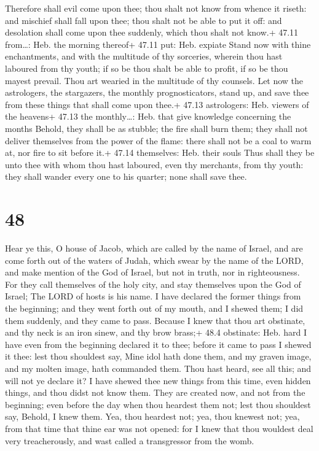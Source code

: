  Therefore shall evil come upon thee; thou shalt not know
from whence it riseth: and mischief shall fall upon thee; thou shalt not
be able to put it off: and desolation shall come upon thee suddenly,
which thou shalt not know.+ 47.11 from\ldots: Heb. the morning thereof+
47.11 put: Heb. expiate  Stand now with thine enchantments,
and with the multitude of thy sorceries, wherein thou hast laboured from
thy youth; if so be thou shalt be able to profit, if so be thou mayest
prevail.  Thou art wearied in the multitude of thy
counsels. Let now the astrologers, the stargazers, the monthly
prognosticators, stand up, and save thee from these things that shall
come upon thee.+ 47.13 astrologers: Heb. viewers of the heavens+ 47.13
the monthly\ldots: Heb. that give knowledge concerning the months
 Behold, they shall be as stubble; the fire shall burn
them; they shall not deliver themselves from the power of the flame:
there shall not be a coal to warm at, nor fire to sit before it.+ 47.14
themselves: Heb. their souls  Thus shall they be unto thee
with whom thou hast laboured, even thy merchants, from thy youth: they
shall wander every one to his quarter; none shall save thee.

\hypertarget{section-47}{%
\section{48}\label{section-47}}

 Hear ye this, O house of Jacob, which are called by the
name of Israel, and are come forth out of the waters of Judah, which
swear by the name of the LORD, and make mention of the God of Israel,
but not in truth, nor in righteousness.  For they call
themselves of the holy city, and stay themselves upon the God of Israel;
The LORD of hosts is his name.  I have declared the former
things from the beginning; and they went forth out of my mouth, and I
shewed them; I did them suddenly, and they came to pass. 
Because I knew that thou art obstinate, and thy neck is an iron sinew,
and thy brow brass;+ 48.4 obstinate: Heb. hard  I have even
from the beginning declared it to thee; before it came to pass I shewed
it thee: lest thou shouldest say, Mine idol hath done them, and my
graven image, and my molten image, hath commanded them. 
Thou hast heard, see all this; and will not ye declare it? I have shewed
thee new things from this time, even hidden things, and thou didst not
know them.  They are created now, and not from the
beginning; even before the day when thou heardest them not; lest thou
shouldest say, Behold, I knew them.  Yea, thou heardest not;
yea, thou knewest not; yea, from that time that thine ear was not
opened: for I knew that thou wouldest deal very treacherously, and wast
called a transgressor from the womb.

